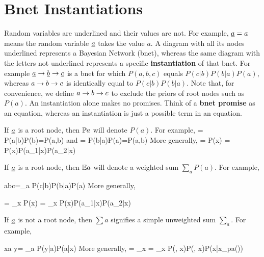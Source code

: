 \chapter{Bnet Instantiations}

\label{ch-bnet-instan}


Random variables are underlined
and their values are not.
For example, $\rva=a$ means
the random variable
$\rva$ takes the value $a$.
A diagram
with all its nodes
underlined represents a
Bayesian Network (bnet),
whereas the same diagram
with the letters not underlined
represents a specific
{\bf instantiation} of that bnet.
For example $\rva\rarrow\rvb\rarrow \rvc$
is a bnet for which
$P(a,b,c)$ equals $P(c|b)P(b|a)P(a)$,
whereas  $a\rightarrow b\rightarrow c$
is identically equal to  $P(c|b)P(b|a)$. Note that, for convenience,
we define $a\rightarrow b\rightarrow c$ to
exclude the priors of root nodes such as $P(a)$. An instantiation alone makes no promises.
Think of a {\bf bnet promise} as an equation,
whereas an
 instantiation is just a possible term in an equation.

If $\rva$ is a root node,
then ${ \mathbb{P}} a$ will denote
$P(a)$.
For example,
\beq
{}
=
P(a|b)P(b)=P(a,b)
\eeq
and 
\beq
{}=
P(b|a)P(a)=P(a,b)
\eeq
More generally,
\beq
\bcen
{}\ecen
=
P(x)
\bcen
{}\ecen
= 
P(x)P(a_1|x)P(a_2|x)
\eeq


If $\rva$ is a root node,
then ${ \mathbb{E}} a$ will denote
a weighted sum $\sum_a P(a)$.
For example,

\beq\EE a\rarrow b\rarrow c=\sum_a P(c|b)P(b|a)P(a)
\eeq
More generally,

\beq
\bcen
{}\ecen
=
\sum_x P(x)
\bcen
{}\ecen
= 
\sum_x P(x)P(a_1|x)P(a_2|x)
\eeq

If $\rva$ is not a root node, then
$\sum a$ signifies
a simple unweighted sum $\sum_a$.
For example,

\beq
x\rarrow\sum a \rarrow y=
\sum_a P(y|a)P(a|x)
\eeq
More generally,
\beq
\bcen
{}\ecen
=
\sum_x
\bcen
{}\ecen=
\sum_x P(\cdot\mid \cdot, x)P(\cdot\mid \cdot, x)P(x|x_{pa(\rvx)})
\eeq

